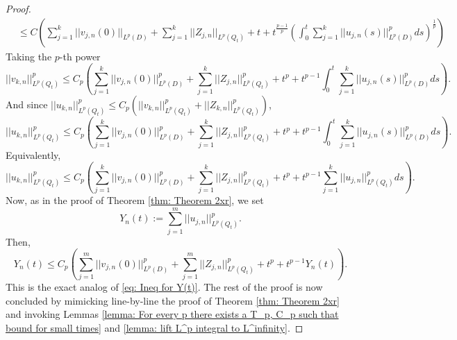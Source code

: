 \documentclass[12pt]{article}
\theoremstyle{definition}
\theoremstyle{remark}
\begin{document}
\begin{proof}
\begin{align*}
        &\leq C\left(\sum_{j=1}^{k} ||v_{j,n}(0)||_{L^p(D)}+\sum_{j=1}^k ||Z_{j,n}||_{L^p(Q_t)}+t+t^{\frac{p-1}{p}} \left(\int_0^t \sum_{j=1}^k ||u_{j,n}(s)||^p_{L^p(D)}ds\right)^{\frac{1}{p}}\right)
    \end{align*}
    Taking the $p$-th power
    \[
    ||v_{k,n}||^p_{L^p(Q_t)}\leq C_{p}\left(\sum_{j=1}^{k} ||v_{j,n}(0)||^p_{L^p(D)}+\sum_{j=1}^k ||Z_{j,n}||^p_{L^p(Q_t)} +t^p+ t^{p-1}\int_0^t \sum_{j=1}^k ||u_{j,n}(s)||^p_{L^p(D)}ds \right).
    \]
    And since $||u_{k,n}||^p_{L^p(Q_t)} \leq C_p(||v_{k,n}||_{L^p(Q_t)}^p + ||Z_{k,n}||_{L^p(Q_t)}^p)$,
    \[
    ||u_{k,n}||^p_{L^p(Q_t)} \leq C_{p}\left(\sum_{j=1}^{k} ||v_{j,n}(0)||^p_{L^p(D)}+\sum_{j=1}^k ||Z_{j,n}||^p_{L^p(Q_t)} + t^p+ t^{p-1}\int_0^t \sum_{j=1}^k ||u_{j,n}(s)||^p_{L^p(D)}ds \right).
    \]
 Equivalently,
 \[
||u_{k,n}||^p_{L^p(Q_t)} \leq C_{p}\left(\sum_{j=1}^{k} ||v_{j,n}(0)||^p_{L^p(D)}+\sum_{j=1}^k ||Z_{j,n}||^p_{L^p(Q_t)} + t^p+t^{p-1}\sum_{j=1}^k ||u_{j,n}||^p_{L^p(Q_t)}ds \right).
 \]
 Now, as in the proof of Theorem \ref{thm: Theorem 2xr}, we set
   \[
   Y_n(t) := \sum_{j=1}^m ||u_{j,n}||_{L^p(Q_t)}^p.
   \]
   Then,
   \[Y_n(t) \leq C_{p}\left(\sum_{j=1}^{m} ||v_{j,n}(0)||^p_{L^p(D)}+\sum_{j=1}^m ||Z_{j,n}||^p_{L^p(Q_t)} + t^p+t^{p-1}Y_n(t)\right).\]
   This is the exact analog of \eqref{eq: Ineq for Y(t)}.  The rest of the proof is now concluded by mimicking line-by-line the proof of Theorem \ref{thm: Theorem 2xr} and invoking Lemmas \ref{lemma: For every p there exists a T_p, C_p such that bound for small times} and \ref{lemma: lift L^p integral to L^infinity}.
\end{proof}




\end{document}
